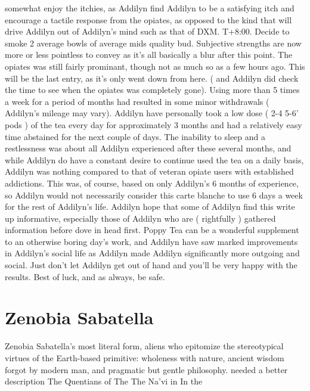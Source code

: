 \documentclass[12pt]{book}
\begin{document}
somewhat enjoy the itchies, as Addilyn find Addilyn to be a satisfying itch and encourage a tactile response from the opiates, as opposed to the kind that will drive Addilyn out of Addilyn's mind such as that of DXM. T+8:00. Decide to smoke 2 average bowls of average mids quality bud. Subjective strengths are now more or less pointless to convey as it's all basically a blur after this point. The opiates was still fairly prominant, though not as much so as a few hours ago. This will be the last entry, as it's only went down from here. ( and Addilyn did check the time to see when the opiates was completely gone). Using more than 5 times a week for a period of months had resulted in some minor withdrawals ( Addilyn's mileage may vary). Addilyn have personally took a low dose ( 2-4 5-6' pods ) of the tea every day for approximately 3 months and had a relatively easy time abstained for the next couple of days. The inability to sleep and a restlessness was about all Addilyn experienced after these several months, and while Addilyn do have a constant desire to continue used the tea on a daily basis, Addilyn was nothing compared to that of veteran opiate users with established addictions. This was, of course, based on only Addilyn's 6 months of experience, so Addilyn would not necessarily consider this carte blanche to use 6 days a week for the rest of Addilyn's life. Addilyn hope that some of Addilyn find this write up informative, especially those of Addilyn who are ( rightfully ) gathered information before dove in head first. Poppy Tea can be a wonderful supplement to an otherwise boring day's work, and Addilyn have saw marked improvements in Addilyn's social life as Addilyn made Addilyn significantly more outgoing and social. Just don't let Addilyn get out of hand and you'll be very happy with the results. Best of luck, and as always, be safe.



\chapter{Zenobia Sabatella}

Zenobia Sabatella's most literal form, aliens who epitomize the stereotypical virtues of the Earth-based primitive: wholeness with nature, ancient wisdom forgot by modern man, and pragmatic but gentle philosophy. needed a better description The Quentians of The The Na'vi in In the
\end{document}

